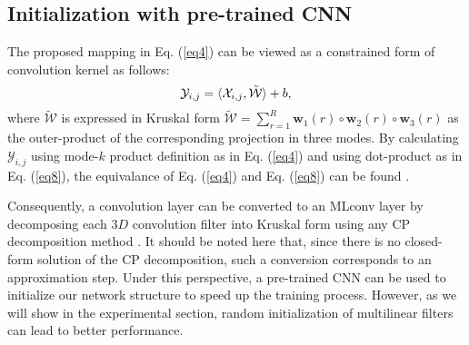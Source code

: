 \documentclass[conference,usletter]{IEEEtran}
\begin{document}
\subsection{Initialization with pre-trained CNN}\label{SS:Initializationpre-trained}
The proposed mapping in Eq. (\ref{eq4}) can be viewed as a constrained form of convolution kernel as follows:
\begin{equation}\label{eq8}
\mathcal{Y}_{i,j}=\braket{\mathcal{X}_{i,j}, \tilde{\mathcal{W}}}+b,
\end{equation}
where $\tilde{\mathcal{W}}$ is expressed in Kruskal form $\tilde{\mathcal{W}}=\sum_{r=1}^{R}\mathbf{w}_1(r)\circ \mathbf{w}_2(r) \circ \mathbf{w}_3(r)$ as the outer-product of the corresponding projection in three modes. By calculating $\mathcal{Y}_{i,j}$ using mode-$k$ product definition as in Eq. (\ref{eq4}) and using dot-product as in Eq. (\ref{eq8}), the equivalance of Eq. (\ref{eq4}) and Eq. (\ref{eq8}) can be found \cite{kolda2009tensor}. 

Consequently, a convolution layer can be converted to an MLconv layer by decomposing each $3D$ convolution filter into Kruskal form using any CP decomposition method \cite{kolda2009tensor}. It should be noted here that, since there is no closed-form solution of the CP decomposition, such a conversion corresponds to an approximation step. Under this perspective, a pre-trained CNN can be used to initialize our network structure to speed up the training process. However, as we will show in the experimental section, random initialization of multilinear filters can lead to better performance.
\end{document}
